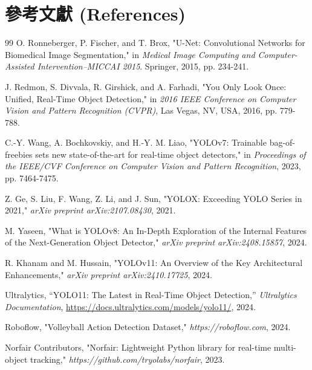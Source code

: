 \documentclass[a4paper,14pt,oneside]{article}
\begin{document}
\newpage
\section*{參考文獻 (References)}

\begin{thebibliography}{99}
     O. Ronneberger, P. Fischer, and T. Brox, "U-Net: Convolutional Networks for Biomedical Image Segmentation," in \textit{Medical Image Computing and Computer-Assisted Intervention–MICCAI 2015}. Springer, 2015, pp. 234-241.
    
     J. Redmon, S. Divvala, R. Girshick, and A. Farhadi, "You Only Look Once: Unified, Real-Time Object Detection," in \textit{2016 IEEE Conference on Computer Vision and Pattern Recognition (CVPR)}, Las Vegas, NV, USA, 2016, pp. 779-788.
    
     C.-Y. Wang, A. Bochkovskiy, and H.-Y. M. Liao, "YOLOv7: Trainable bag-of-freebies sets new state-of-the-art for real-time object detectors," in \textit{Proceedings of the IEEE/CVF Conference on Computer Vision and Pattern Recognition}, 2023, pp. 7464-7475.
    
     Z. Ge, S. Liu, F. Wang, Z. Li, and J. Sun, "YOLOX: Exceeding YOLO Series in 2021," \textit{arXiv preprint arXiv:2107.08430}, 2021.
    
     M. Yaseen, "What is YOLOv8: An In-Depth Exploration of the Internal Features of the Next-Generation Object Detector," \textit{arXiv preprint arXiv:2408.15857}, 2024.
    
     R. Khanam and M. Hussain, "YOLOv11: An Overview of the Key Architectural Enhancements," \textit{arXiv preprint arXiv:2410.17725}, 2024.
    
     Ultralytics, ``YOLO11: The Latest in Real-Time Object Detection,'' \textit{Ultralytics Documentation}, \url{https://docs.ultralytics.com/models/yolo11/}, 2024.
    
     Roboflow, "Volleyball Action Detection Dataset," \textit{https://roboflow.com}, 2024.
    
     Norfair Contributors, "Norfair: Lightweight Python library for real-time multi-object tracking," \textit{https://github.com/tryolabs/norfair}, 2023.
    

\end{thebibliography}
\end{document}
